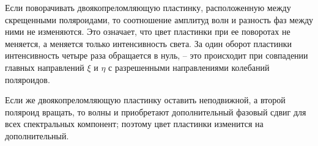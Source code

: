 \documentclass[a4paper,12pt]{article}
\begin{document}
Если поворачивать двоякопреломляющую пластинку, расположенную между скрещенными поляроидами, то соотношение амплитуд волн и разность фаз между ними не изменяются. Это означает, что цвет пластинки при ее поворотах не меняется, а меняется только интенсивность света. За один оборот пластинки интенсивность четыре раза обращается в нуль, -- это происходит при совпадении главных направлений $\xi$ и $\eta$ с разрешенными направлениями колебаний поляроидов.

Если же двоякопреломляющую пластинку оставить неподвижной, а второй поляроид вращать, то волны и приобретают дополнительный фазовый сдвиг для всех спектральных компонент; поэтому цвет пластинки изменится на дополнительный.

\end{document}
